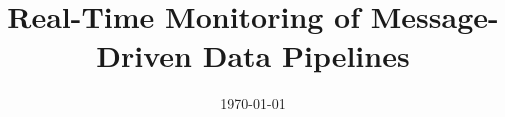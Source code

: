 \documentclass[a4paper, 11pt, oneside]{Thesis}  %
\begin{document}
\frontmatter      %

\title  {Real-Time Monitoring of Message-Driven Data Pipelines}
            
\addresses  {\groupname\\\deptname\\\univname}  %
\date       {\today}
\subject    {}
\keywords   {}


\maketitle


\fancyhead{}  %
\rhead{\thepage}  %
\lhead{}  %

\pagestyle{fancy}  %
\end{document}
